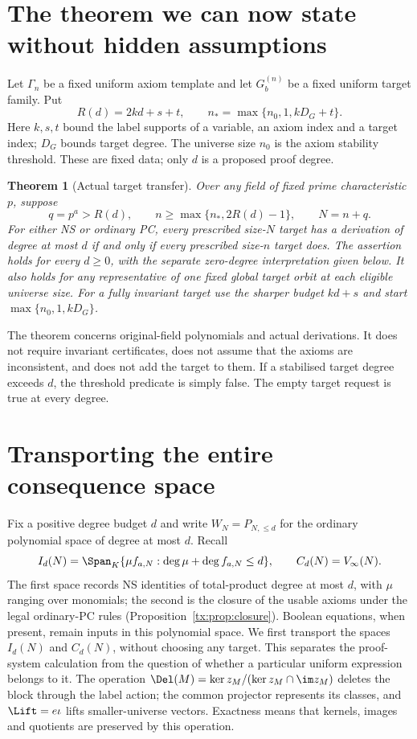 \documentclass[11pt,a4paper,oneside,openany]{book}
\newtheorem{theorem}{Theorem}[chapter]
\theoremstyle{definition}\newtheorem{definition}[theorem]{Definition}
\theoremstyle{remark}\newtheorem{remark}[theorem]{Remark}
\numberwithin{equation}{chapter}
\begin{document}
\section{The theorem we can now state without hidden assumptions}
Let $\Gamma_n$ be a fixed uniform axiom template and let $G_b^{(n)}$ be
a fixed uniform target family. Put
\[
 R(d)=2kd+s+t,\qquad n_*=\max\{n_0,1,kD_G+t\}.
\]
Here $k,s,t$ bound the label supports of a variable, an axiom index and
a target index; $D_G$ bounds target degree. The universe size $n_0$ is the axiom
stability threshold. These are fixed data; only $d$ is a proposed proof degree.

\begin{theorem}[Actual target transfer]\label{tx:thm:transfer}
Over any field of fixed prime characteristic $p$, suppose
\[
 q=p^a>R(d),\qquad n\ge\max\{n_*,2R(d)-1\},\qquad N=n+q.
\]
For either NS or ordinary PC, every prescribed size-$N$ target has a
derivation of degree at most $d$ if and only if every prescribed size-$n$
target does. The assertion holds for every $d\ge0$, with the separate
zero-degree interpretation given below. It also holds for any
representative of one fixed global target orbit at each eligible universe size.
For a fully invariant target use the sharper budget $kd+s$ and start
$\max\{n_0,1,kD_G\}$.
\end{theorem}

The theorem concerns original-field polynomials and actual derivations.
It does not require invariant certificates, does not assume that the
axioms are inconsistent, and does not add the target to them. If a
stabilised target degree exceeds $d$, the threshold predicate is simply
false. The empty target request is true at every degree.

\section{Transporting the entire consequence space}
Fix a positive degree budget $d$ and write $W_N=P_{N,\le d}$
for the ordinary polynomial space of degree at most $d$. Recall
\[
 I_d(N)=\Span_K\{\mu f_{a,N}:\deg\mu+\deg f_{a,N}\le d\},
 \qquad C_d(N)=V_\infty(N).
\]
The first space records NS identities of total-product degree at most
$d$, with $\mu$ ranging over monomials; the second is the closure of the usable axioms under the legal
ordinary-PC rules (Proposition~\ref{tx:prop:closure}). Boolean equations,
when present, remain inputs in this polynomial space.
We first transport the spaces $I_d(N)$ and $C_d(N)$, without choosing
any target. This separates the proof-system calculation from the
question of whether a particular uniform expression belongs to it.
The operation $\Del(M)=\ker z_M/(\ker z_M\cap\im z_M)$ deletes the
block through the label action; the common projector represents its
classes, and $\Lift=e\iota$ lifts smaller-universe vectors. Exactness means
that kernels, images and quotients are preserved by this operation.
\end{document}
